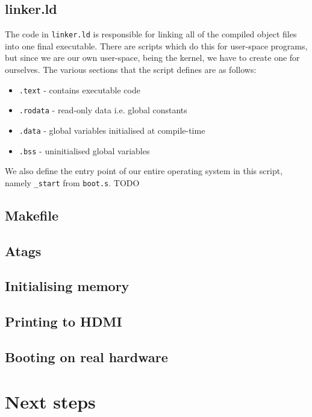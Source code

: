 \documentclass[10pt,a4paper]{article}
\newcommand{\code}[1]{\texttt{#1}}
\begin{document}
\subsection{linker.ld}
The code in \code{linker.ld} is responsible for linking all of the compiled
object files into one final executable. There are scripts which do this for
user-space programs, but since we are our own user-space, being the kernel, we
have to create one for ourselves. The various sections that the script defines
are as follows:
\begin{itemize}
    \itemsep0em
    \item \code{.text} - contains executable code
    \item \code{.rodata} - read-only data i.e. global constants
    \item \code{.data} - global variables initialised at compile-time
    \item \code{.bss} - uninitialised global variables
\end{itemize}

We also define the entry point of our entire operating system in this script,
namely \code{\_start} from \code{boot.s}. TODO

\subsection{Makefile}
\subsection{Atags}
\subsection{Initialising memory}
\subsection{Printing to HDMI}
\subsection{Booting on real hardware}


\section{Next steps}
\end{document}
